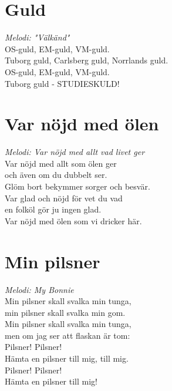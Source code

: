 \newpage
\section{Guld}
\textit{Melodi: "Välkänd"}
\vspace{2mm}\\
OS-guld, EM-guld, VM-guld.\\
Tuborg guld, Carlsberg guld, Norrlands guld.\\
OS-guld, EM-guld, VM-guld.\\
Tuborg guld - STUDIESKULD!

\section{Var nöjd med ölen}
\textit{Melodi: Var nöjd med allt vad livet ger}
\vspace{2mm}\\
Var nöjd med allt som ölen ger\\
och även om du dubbelt ser.\\
Glöm bort bekymmer sorger och besvär.\\
Var glad och nöjd för vet du vad\\
en folköl gör ju ingen glad.\\
Var nöjd med ölen som vi dricker här.

\section{Min pilsner}
\textit{Melodi: My Bonnie}
\vspace{2mm}\\
Min pilsner skall svalka min tunga,\\
min pilsner skall svalka min gom.\\
Min pilsner skall svalka min tunga,\\
men om jag ser att flaskan är tom:\\
Pilsner! Pilsner!\\
Hämta en pilsner till mig, till mig.\\
Pilsner! Pilsner!\\
Hämta en pilsner till mig!
